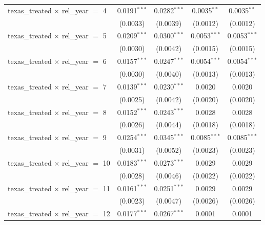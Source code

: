 \begin{tabular}{lcccc}
   texas\_treated $\times$ rel\_year $=$ 4      & 0.0191$^{***}$ & 0.0282$^{***}$  & 0.0035$^{**}$   & 0.0035$^{**}$\\   
                                                & (0.0033)       & (0.0039)        & (0.0012)        & (0.0012)\\   
   texas\_treated $\times$ rel\_year $=$ 5      & 0.0209$^{***}$ & 0.0300$^{***}$  & 0.0053$^{***}$  & 0.0053$^{***}$\\   
                                                & (0.0030)       & (0.0042)        & (0.0015)        & (0.0015)\\   
   texas\_treated $\times$ rel\_year $=$ 6      & 0.0157$^{***}$ & 0.0247$^{***}$  & 0.0054$^{***}$  & 0.0054$^{***}$\\   
                                                & (0.0030)       & (0.0040)        & (0.0013)        & (0.0013)\\   
   texas\_treated $\times$ rel\_year $=$ 7      & 0.0139$^{***}$ & 0.0230$^{***}$  & 0.0020          & 0.0020\\   
                                                & (0.0025)       & (0.0042)        & (0.0020)        & (0.0020)\\   
   texas\_treated $\times$ rel\_year $=$ 8      & 0.0152$^{***}$ & 0.0243$^{***}$  & 0.0028          & 0.0028\\   
                                                & (0.0026)       & (0.0044)        & (0.0018)        & (0.0018)\\   
   texas\_treated $\times$ rel\_year $=$ 9      & 0.0254$^{***}$ & 0.0345$^{***}$  & 0.0085$^{***}$  & 0.0085$^{***}$\\   
                                                & (0.0031)       & (0.0052)        & (0.0023)        & (0.0023)\\   
   texas\_treated $\times$ rel\_year $=$ 10     & 0.0183$^{***}$ & 0.0273$^{***}$  & 0.0029          & 0.0029\\   
                                                & (0.0028)       & (0.0046)        & (0.0022)        & (0.0022)\\   
   texas\_treated $\times$ rel\_year $=$ 11     & 0.0161$^{***}$ & 0.0251$^{***}$  & 0.0029          & 0.0029\\   
                                                & (0.0023)       & (0.0047)        & (0.0026)        & (0.0026)\\   
   texas\_treated $\times$ rel\_year $=$ 12     & 0.0177$^{***}$ & 0.0267$^{***}$  & 0.0001          & 0.0001\\   

\end{tabular}
